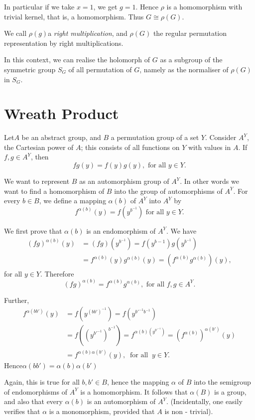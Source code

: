  In particular if we take $x=1$, we get $g =1$. Hence $\rho$ is a
 homomorphism with trivial  kernel, that is, a homomorphism. Thus $G
 \cong \rho(G)$. 
 
 We call $\rho(g)$a \textit{right multiplication}, and $\rho (G)$ the
 regular permutation representation by right multiplications. 
 
In this context, we can realise the holomorph of $G$ as a subgroup of
the symmetric group $S_G$ of all permutation of $G$, namely as the
normaliser of $\rho(G)$ in $S_G$. 
 
\section{Wreath Product}\label{chap6:sec6}  %
 
Let\pageoriginale $A$ be an abstract group, and $B$ a permutation group of a set
$Y$. Consider $A^Y$, the Cartesian power of $A$; this consists of all
functions  on $Y$ with values in $A$. If $f,g \in  A^Y$, then  
$$
fg(y) = f(y) g(y), \text{ for all } y \in Y. 
$$
 
We want to represent $B$ as an automorphism group of $A^Y$. In other
words we want to find a homomorphism of $B$ into the group of
automorphisms of $A^Y$. For every $b \in  B$, we define a
mapping $\alpha (b)$ of $A^Y$ into $A^Y$ by  
$$
f^{\alpha (b)} (y) = f(y^{b^{-1}}) \text{ for all } y \in  Y.
$$
 
We first prove that $\alpha (b)$ is an endomorphism of $A^Y$. We have 
\begin{align*}
  (fg)^{\alpha (b)} (y) & = (fg)(y^{b^{-1}}) = f(y^{b-1}) g (y^{b^{-1}}) \\
  & =f^{\alpha (b)} (y) g^{\alpha (b)} (y) = (f^{\alpha (b)}g^{\alpha (b)}) (y), 
\end{align*}
for all $y \in  Y$. Therefore 
$$
(fg)^{\alpha (b)}= f^{\alpha (b)} g^{\alpha (b)}, \text{ for all } f,g
\in  A^Y. 
$$

Further,
\begin{align*}
  f^{\alpha (bb')}(y) & =f(y^{(bb')^{-1}}) = f(y^{b'^{-1} b^{-1}}) \\
  &= f((y^{b'^{-1}})^{b^{-1}}) = f^{\alpha (b) (y^{b'^{-1}})}  =
  (f^{\alpha (b)})^{\alpha (b')}(y) \\ 
  &= f^{\alpha (b) \alpha (b')}(y),~ \text{ for all } ~y  \in  Y.
\end{align*}
Hence\pageoriginale \qquad $ \alpha (bb') = \alpha (b) \alpha (b')$

Again, this is true for all $b, b' \in  B$, hence the mapping
$\alpha$ of $B$ into the semigroup of endomorphisms of $A^Y$ is a
homomorphism. It follows that $\alpha(B)$ is a group, and also that
every $\alpha(b)$ is an automorphism of $A^Y$. (Incidentally, one
easily verifies that $\alpha$ is a monomorphism, provided that $A$ is
non - trivial). 

